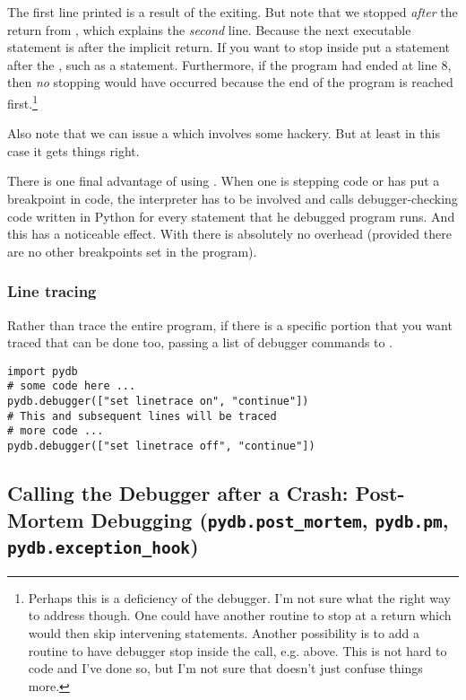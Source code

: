 The first  line printed is a result of the
 exiting. But note that we stopped \emph{after\/} the
return from , which explains the \emph{second\/}
 line. Because the next executable statement is after
the implicit return. If you want to stop inside  put a
statement after the , such as a 
statement. Furthermore, if the program had ended at line 8, then
\emph{no\/} stopping would have occurred because the end of the program
is reached first.\footnote{Perhaps this is a deficiency of the
debugger. I'm not sure what the right way to address though. One could
have another routine to stop at a return which would then skip
intervening statements. Another possibility is to add a routine to
have debugger stop inside the call, e.g.  above. This
is not hard to code and I've done so, but I'm not sure that doesn't
just confuse things more.}

Also note that we can issue a  which involves some
hackery. But at least in this case it gets things right.

There is one final advantage of using .  When one is
stepping code or has put a breakpoint in code, the interpreter has to
be involved and calls debugger-checking code written in Python for
every statement that he debugged program runs. And this has a
noticeable effect. With  there is absolutely no
overhead (provided there are no other breakpoints set in the program).

\subsubsection{Line tracing}\label{subsubsection-linetracing}
Rather than trace the entire program, if there is a specific portion
that you want traced that can be done too, passing a list of debugger
commands to .

\begin{verbatim}
import pydb 
# some code here ...
pydb.debugger(["set linetrace on", "continue"])
# This and subsequent lines will be traced
# more code ...
pydb.debugger(["set linetrace off", "continue"])
\end{verbatim}

\subsection{Calling the Debugger after a Crash: Post-Mortem
  Debugging ({\tt pydb.post_mortem}, {\tt pydb.pm}, {\tt pydb.exception_hook})}\label{subsection-post-mortem}

